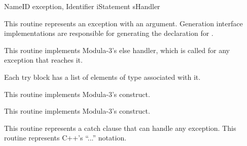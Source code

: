 \begin{functionality}
\end{functionality}

	{NameID exception, Identifier i}{Statement s}{Handler}
\begin{functionality}
This routine represents an exception with an argument.  Generation
interface implementations are responsible for generating the
declaration for .
\end{functionality}
\begin{functionality}
This routine implements Modula-3's else handler, which is called for
any exception that reaches it.
\end{functionality}

\begin{functionality}
Each try block has a list of elements of type 
associated with it.  

\end{functionality}

\begin{functionality}
This routine implements Modula-3's  construct.  
\end{functionality}
\begin{functionality}
This routine implements Modula-3's  construct.  
\end{functionality}


\begin{functionality}
This routine represents a catch clause that can handle any exception.
This routine represents C++'s ``...'' notation.
\end{functionality}

